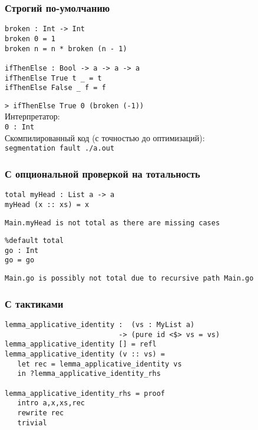 \begin{frame}[fragile]
   \frametitle{Строгий по-умолчанию}
   \begin{lstlisting}
broken : Int -> Int
broken 0 = 1
broken n = n * broken (n - 1)

ifThenElse : Bool -> a -> a -> a
ifThenElse True t _ = t
ifThenElse False _ f = f
   \end{lstlisting}
   \texttt{> ifThenElse True 0 (broken (-1))}\\\vspace{0.5em}
   Интерпретатор:\\
   \texttt{0 : Int}\\\vspace{0.5em}
   Скомпилированный код (с точностью до оптимизаций):\\
   \texttt{segmentation fault ./a.out}
\end{frame}

\begin{frame}[fragile]
   \frametitle{С опциональной проверкой на тотальность}
   \begin{lstlisting}
total myHead : List a -> a
myHead (x :: xs) = x
   \end{lstlisting}
   \texttt{Main.myHead is not total as there are missing cases}
   \begin{lstlisting}
%default total
go : Int
go = go
   \end{lstlisting}
   \texttt{Main.go is possibly not total due to recursive path Main.go}
\end{frame}

\begin{frame}[fragile]
   \frametitle{С тактиками}
   \begin{lstlisting}
lemma_applicative_identity :  (vs : MyList a)
                           -> (pure id <$> vs = vs)
lemma_applicative_identity [] = refl
lemma_applicative_identity (v :: vs) =
   let rec = lemma_applicative_identity vs
   in ?lemma_applicative_identity_rhs

lemma_applicative_identity_rhs = proof
   intro a,x,xs,rec
   rewrite rec
   trivial
   \end{lstlisting}
\end{frame}

